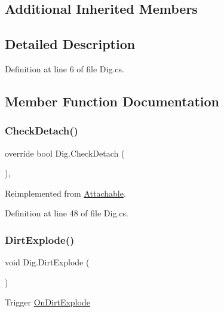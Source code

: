 \subsection*{Additional Inherited Members}


\subsection{Detailed Description}


Definition at line 6 of file Dig.\+cs.



\subsection{Member Function Documentation}
\mbox{\label{class_dig_abec7f4de75d9d61991eca406c402fb51}} 
\subsubsection{\texorpdfstring{Check\+Detach()}{CheckDetach()}}
{\footnotesize\ttfamily override bool Dig.\+Check\+Detach (\begin{DoxyParamCaption}{ }\end{DoxyParamCaption})\hspace{0.3cm}{\ttfamily [protected]}, {\ttfamily [virtual]}}



Reimplemented from \mbox{\hyperlink{class_attachable_a5cd6ea1bf16c527c033e6f09681f84f8}{Attachable}}.



Definition at line 48 of file Dig.\+cs.

\mbox{\label{class_dig_a75281eb5b1b5803c8f01b3ac8509cb51}} 
\subsubsection{\texorpdfstring{Dirt\+Explode()}{DirtExplode()}}
{\footnotesize\ttfamily void Dig.\+Dirt\+Explode (\begin{DoxyParamCaption}{ }\end{DoxyParamCaption})}



Trigger \mbox{\hyperlink{class_dig_a02ef58f6d518aa38c5a21cb0409738e7}{On\+Dirt\+Explode}} 



